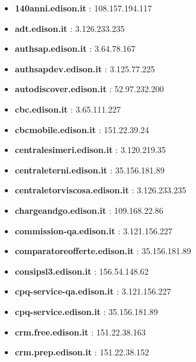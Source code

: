 \documentclass{article}
\begin{document}
\begin{itemize}
    
        \item \textbf{ 140anni.edison.it }: 108.157.194.117
    
        \item \textbf{ adt.edison.it }: 3.126.233.235
    
        \item \textbf{ authsap.edison.it }: 3.64.78.167
    
        \item \textbf{ authsapdev.edison.it }: 3.125.77.225
    
        \item \textbf{ autodiscover.edison.it }: 52.97.232.200
    
        \item \textbf{ cbc.edison.it }: 3.65.111.227
    
        \item \textbf{ cbcmobile.edison.it }: 151.22.39.24
    
        \item \textbf{ centralesimeri.edison.it }: 3.120.219.35
    
        \item \textbf{ centraleterni.edison.it }: 35.156.181.89
    
        \item \textbf{ centraletorviscosa.edison.it }: 3.126.233.235
    
        \item \textbf{ chargeandgo.edison.it }: 109.168.22.86
    
        \item \textbf{ commission-qa.edison.it }: 3.121.156.227
    
        \item \textbf{ comparatoreofferte.edison.it }: 35.156.181.89
    
        \item \textbf{ consipsl3.edison.it }: 156.54.148.62
    
        \item \textbf{ cpq-service-qa.edison.it }: 3.121.156.227
    
        \item \textbf{ cpq-service.edison.it }: 35.156.181.89
    
        \item \textbf{ crm.free.edison.it }: 151.22.38.163
    
        \item \textbf{ crm.prep.edison.it }: 151.22.38.152
    

\end{itemize}
\end{document}
